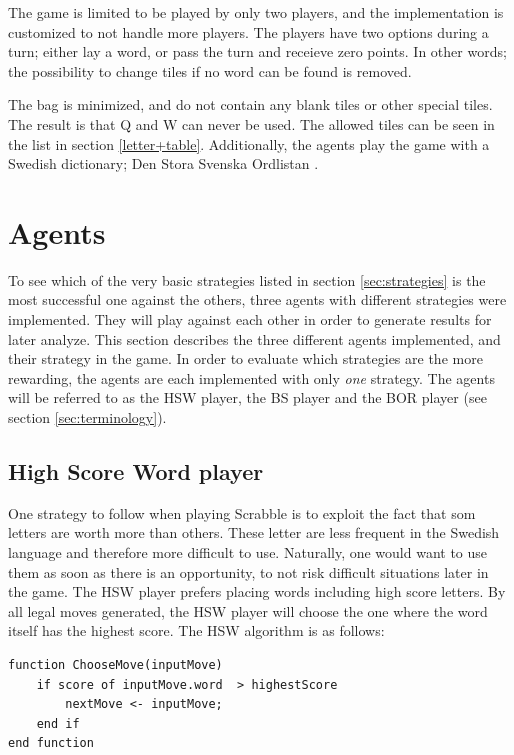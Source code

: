 \documentclass[a4paper, 12pt]{report}
\begin{document}
The game is limited to be played by only two players, and the implementation is customized to not handle more players. The players have two options during a turn; either lay a word, or pass the turn and receieve zero points. In other words; the possibility to change tiles if no word can be found is removed. 

The bag is minimized, and do not contain any blank tiles or other special tiles. The result is that Q and W can never be used. The allowed tiles can be seen in the list in section \ref{letter+table}. Additionally, the agents play the game with a Swedish dictionary; Den Stora Svenska Ordlistan \cite{dictionary}.

\section{Agents}
\label{sec:agents}
To see which of the very basic strategies listed in section \ref{sec:strategies} is the most successful one against the others, three agents with different strategies were implemented. They will play against each other in order to generate results for later analyze. This section describes the three different agents implemented, and their strategy in the game. In order to evaluate which strategies are the more rewarding, the agents are each implemented with only \emph{one} strategy. The agents will be referred to as the HSW player, the BS player and the BOR player (see section \ref{sec:terminology}).

\subsection{High Score Word player}
One strategy to follow when playing Scrabble is to exploit the fact that som letters are worth more than others. These letter are less frequent in the Swedish language and therefore more difficult to use. Naturally, one would want to use them as soon as there is an opportunity, to not risk difficult situations later in the game. The HSW player prefers placing words including high score letters. By all legal moves generated, the HSW player will choose the one where the word itself has the highest score. The HSW algorithm is as follows:

\begin{lstlisting}
function ChooseMove(inputMove)
	if score of inputMove.word  > highestScore
		nextMove <- inputMove;
	end if
end function
\end{lstlisting}
\end{document}
